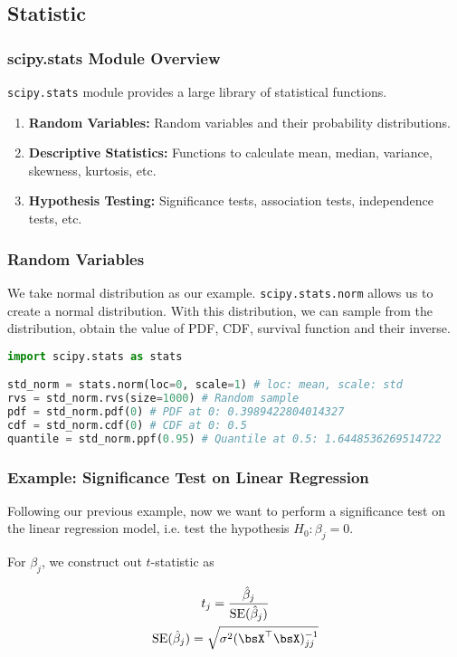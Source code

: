 \documentclass[beamer, en, version=2.0]{huangfusl-template}
\begin{document}
    \subsection{Statistic}
    \begin{frame}[fragile]
        \frametitle{{\normalsize\ttfamily scipy.stats} Module Overview}

        {\footnotesize\verb|scipy.stats|} module provides a large library of statistical functions.

        \begin{enumerate}
            \item \textbf{Random Variables:} Random variables and their probability distributions.
            \item \textbf{Descriptive Statistics:} Functions to calculate mean, median, variance, skewness, kurtosis, etc.
            \item \textbf{Hypothesis Testing:} Significance tests, association tests, independence tests, etc.
        \end{enumerate}
    \end{frame}
    \begin{frame}[fragile]
        \frametitle{Random Variables}

        We take normal distribution as our example. {\footnotesize\verb|scipy.stats.norm|} allows us to create a normal distribution. With this distribution, we can sample from the distribution, obtain the value of PDF, CDF, survival function and their inverse.

\begin{lstlisting}[language=python]
import scipy.stats as stats

std_norm = stats.norm(loc=0, scale=1) # loc: mean, scale: std
rvs = std_norm.rvs(size=1000) # Random sample
pdf = std_norm.pdf(0) # PDF at 0: 0.3989422804014327
cdf = std_norm.cdf(0) # CDF at 0: 0.5
quantile = std_norm.ppf(0.95) # Quantile at 0.5: 1.6448536269514722
\end{lstlisting}
    \end{frame}
    \begin{frame}
        \frametitle{Example: Significance Test on Linear Regression}

        Following our previous example, now we want to perform a significance test on the linear regression model, i.e. test the hypothesis $H_0: \beta_j = 0$.

        For $\beta_j$, we construct out $t$-statistic as

        \begin{gather}
            t_j = \frac{\hat\beta_j}{\text{SE}(\hat\beta_j)} \\
            \text{SE}(\hat\beta_j) = \sqrt{\sigma^2 (\bsX^\top \bsX)^{-1}_{jj}}
        \end{gather}
    \end{frame}
\end{document}
